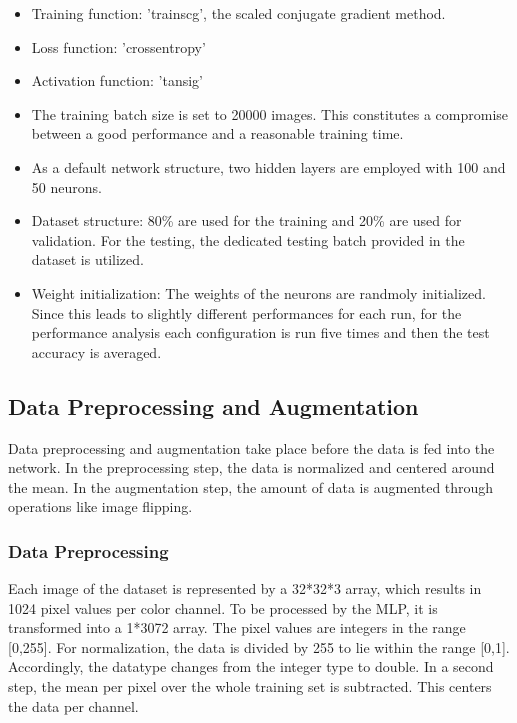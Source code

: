 \begin{itemize}
	\item Training function: 'trainscg', the scaled conjugate gradient method.

	\item Loss function: 'crossentropy'

	\item Activation function: 'tansig'

	\item The training batch size is set to 20000 images. This constitutes a compromise between a good performance and a reasonable training time.

	\item As a default network structure, two hidden layers are employed with 100 and 50 neurons.

	\item Dataset structure: 80\% are used for the training and 20\% are used for validation. For the testing, the dedicated testing batch provided in the dataset is utilized.

	\item Weight initialization: The weights of the neurons are randmoly initialized. Since this leads to slightly different performances for each run, for the performance analysis each configuration is run five times and then the test accuracy is averaged.
\end{itemize}

\FloatBarrier
\subsection{Data Preprocessing and Augmentation}\label{subsec:preProp}

Data preprocessing and augmentation take place before the data is fed into the network. In the preprocessing step, the data is normalized and centered around the mean. In the augmentation step, the amount of data is augmented through operations like image flipping.

\subsubsection{Data Preprocessing}\label{subsub:dataPreProp}

  	Each image of the dataset is represented by a 32*32*3 array, which results in 1024 pixel values per color channel. To be processed by the MLP, it is transformed into a 1*3072 array. The pixel values are integers in the range [0,255]. For normalization, the data is divided by 255 to lie within the range [0,1]. Accordingly, the datatype changes from the integer type to double. In a second step, the mean per pixel over the whole training set is subtracted. This centers the data per channel.


